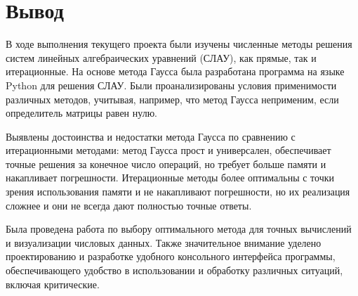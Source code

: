 \documentclass[14pt]{article}
\begin{document}
\section{Вывод}

В ходе выполнения текущего проекта были изучены численные методы решения систем линейных алгебраических уравнений (СЛАУ), как прямые, так и итерационные. На основе метода Гаусса была разработана программа на языке Python для решения СЛАУ. Были проанализированы условия применимости различных методов, учитывая, например, что метод Гаусса неприменим, если определитель матрицы равен нулю.

Выявлены достоинства и недостатки метода Гаусса по сравнению с итерационными методами: метод Гаусса прост и универсален, обеспечивает точные решения за конечное число операций, но требует больше памяти и накапливает погрешности. Итерационные методы более оптимальны с точки зрения использования памяти и не накапливают погрешности, но их реализация сложнее и они не всегда дают полностью точные ответы.

Была проведена работа по выбору оптимального метода для точных вычислений и визуализации числовых данных. Также значительное внимание уделено проектированию и разработке удобного консольного интерфейса программы, обеспечивающего удобство в использовании и обработку различных ситуаций, включая критические.
\end{document}
